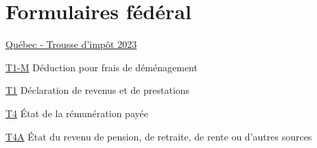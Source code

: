 \chapter*{Formulaires fédéral \cat}

\href{https://www.canada.ca/fr/agence-revenu/services/formulaires-publications/trousses-impot-toutes-annees-imposition/trousse-generale-impot-prestations/quebec.html}{Québec - Trousse d'impôt 2023}

\href{https://www.canada.ca/fr/agence-revenu/services/formulaires-publications/formulaires/t1-m.html}{T1-M}
Déduction pour frais de déménagement

\href{https://www.canada.ca/fr/agence-revenu/services/formulaires-publications/trousses-impot-toutes-annees-imposition/trousse-generale-impot-prestations/quebec/5005-r.html}{T1}
Déclaration de revenus et de prestations

\href{https://www.canada.ca/fr/agence-revenu/services/formulaires-publications/formulaires/t4.html}{T4}
État de la rémunération payée

\href{https://www.canada.ca/fr/agence-revenu/services/formulaires-publications/formulaires/t4a.html}{T4A}
État du revenu de pension, de retraite, de rente ou d'autres sources
